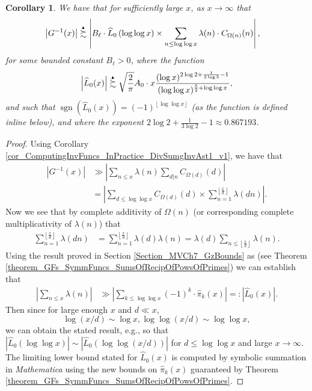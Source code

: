 \documentclass[11pt,reqno,a4letter]{article}
\numberwithin{figure}{section}
\numberwithin{table}{section}
\newcommand{\floor}[1]{\left\lfloor #1 \right\rfloor}
\newcommand{\Floor}[2]{\ensuremath{\left\lfloor \frac{#1}{#2} \right\rfloor}}
\theoremstyle{plain}
\newtheorem{cor}[theorem]{Corollary}
\numberwithin{theorem}{section}
\theoremstyle{definition}
\newcommand{\NBRef}[1]{}
\newcommand{\SuccSim}[0]{\overset{_{\scriptsize{\blacktriangle}}}{\succsim}}
\begin{document}
\begin{cor} 
\label{cor_ASemiForm_ForGInvx_v1} 
We have that for sufficiently large $x$, as $x \rightarrow \infty$ that 
\begin{align*} 
\left\lvert G^{-1}(x) \right\rvert & \SuccSim 
     \left\lvert 
     B_{\ell} \cdot \widehat{L}_0\left(\log\log x\right) \times \sum_{n \leq \log\log x} 
     \lambda(n) \cdot C_{\Omega(n)}(n) \right\rvert, 
\end{align*} 
for some bounded constant $B_{\ell} > 0$, where the function 
\[
\left\lvert \widehat{L}_0(x) \right\rvert \SuccSim 
     \sqrt{\frac{2}{\pi}} A_0 \cdot x 
     \frac{(\log x)^{2\log 2+ \frac{1}{3 \log 2} - 1}}{ 
     (\log\log x)^{\frac{5}{2} + \log\log x}}, 
\]
and such that $\operatorname{sgn}(\widehat{L}_0(x)) = (-1)^{\floor{\log\log x}}$ 
(as the function is defined inline below), and 
where the exponent $2\log 2+ \frac{1}{3 \log 2} - 1 \approx 0.867193$. 
\end{cor} 
\NBRef{A10-2020.04-26} 
\begin{proof} 
Using Corollary \ref{cor_ComputingInvFuncs_InPractice_DivSumgInvAst1_v1}, we have that 
\begin{align*} 
\left\lvert G^{-1}(x) \right\rvert & \gg 
     \left\lvert \sum_{n \leq x} \lambda(n) \sum_{d|n} C_{\Omega(d)}(d) \right\rvert \\ 
     & = \left\lvert \sum_{d \leq \log\log x} C_{\Omega(d)}(d) \times 
     \sum_{n=1}^{\Floor{x}{d}} \lambda(dn) \right\rvert. 
\end{align*} 
Now we see that by complete additivity of $\Omega(n)$ 
(or corresponding complete multiplicativity of $\lambda(n)$) that 
\begin{align*} 
\sum_{n=1}^{\Floor{x}{d}} \lambda(dn) & = \sum_{n=1}^{\Floor{x}{d}} \lambda(d) \lambda(n) 
     = \lambda(d) \sum_{n \leq \Floor{x}{d}} \lambda(n). 
\end{align*} 
Using the result proved in Section \ref{Section_MVCh7_GzBounds} as 
(see Theorem \ref{theorem_GFs_SymmFuncs_SumsOfRecipOfPowsOfPrimes})
we can establish that 
\begin{align*} 
\left\lvert \sum_{n \leq x} \lambda(n) \right\rvert & \gg 
     \left\lvert \sum_{k \leq \log\log x} (-1)^k \cdot \widehat{\pi}_k(x) \right\rvert 
     =: \left\lvert \widehat{L}_0(x) \right\rvert. 
\end{align*} 
Then since for large enough $x$ and $d \ll x$, 
\[
\log(x/d) \sim \log x, \log\log(x/d) \sim \log\log x, 
\] 
we can obtain the stated result, e.g., so that 
$\left\lvert \widehat{L}_0(\log\log x) \right\rvert \sim 
 \left\lvert \widehat{L}_0(\log\log (x/d)) \right\rvert$ for $d \leq \log\log x$ and 
large $x \rightarrow \infty$. 
The limiting lower bound stated for $\widehat{L}_0(x)$ is computed by symbolic summation 
in \emph{Mathematica} using the new bounds on $\widehat{\pi}_k(x)$ guaranteed by 
Theorem \ref{theorem_GFs_SymmFuncs_SumsOfRecipOfPowsOfPrimes}. 
\end{proof} 
\end{document}
